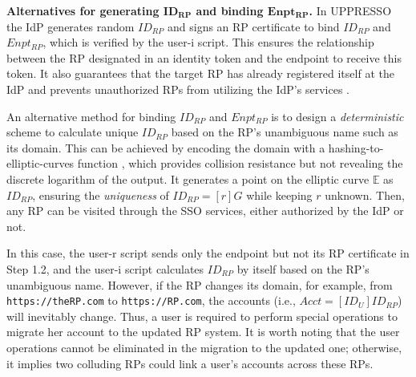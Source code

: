 %


\noindent \textbf{Alternatives for generating $\boldsymbol{ID_{RP}}$ and binding $\boldsymbol{Enpt_{RP}}$.}
In UPPRESSO the IdP generates random $ID_{RP}$ and signs an RP certificate to bind $ID_{RP}$ and $Enpt_{RP}$, which is verified by the user-i script.
This ensures the relationship between the RP designated in an identity token and the endpoint to receive this token.
It also guarantees that the target RP has already registered itself at the IdP and prevents unauthorized RPs from utilizing the IdP's services \cite{OpenIDConnect,save-flow}.

An alternative method for binding $ID_{RP}$ and $Enpt_{RP}$ is
 to design a \emph{deterministic} scheme to calculate unique $ID_{RP}$ based on the RP's unambiguous name such as its domain.
This can be achieved by encoding the domain with a hashing-to-elliptic-curves function \cite{irtf-cfrg-hash-to-curve-16}, which provides collision resistance but not revealing the discrete logarithm of the output. It generates a point on the elliptic curve $\mathbb{E}$ as $ID_{RP}$, ensuring the \emph{uniqueness} of $ID_{RP} = [r]G$ while keeping $r$ unknown. %
Then, any RP can be visited through the SSO services, either authorized by the IdP or not.

In this case, the user-r script sends only the endpoint but not its RP certificate in Step 1.2, and the user-i script calculates $ID_{RP}$ by itself based on the RP's unambiguous name. 
However, if the RP changes its domain, for example, from \verb+https://theRP.com+ to \verb+https://RP.com+, the accounts (i.e., $Acct = [ID_U]ID_{RP}$) will inevitably change.
Thus, a user is required to perform special operations to migrate her account to the updated RP system.
It is worth noting that the user operations cannot be eliminated in the migration to the updated one;
otherwise, it implies two colluding RPs could link a user's accounts across these RPs.


